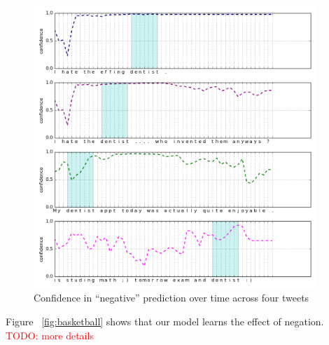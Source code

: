 \documentclass{article} %
\newcommand{\todo}[1]{\textcolor{red}{TODO: #1}}
\begin{document}
\begin{figure}[h!]
\begin{center}
\includegraphics[width=0.95\textwidth]{figs/dentist}
\end{center}
\caption{Confidence in ``negative'' prediction over time across four tweets}
\label{fig:dentist}
\end{figure}

Figure ~\ref{fig:basketball} shows that our model learns the effect of negation. \todo{more details}
\end{document}
